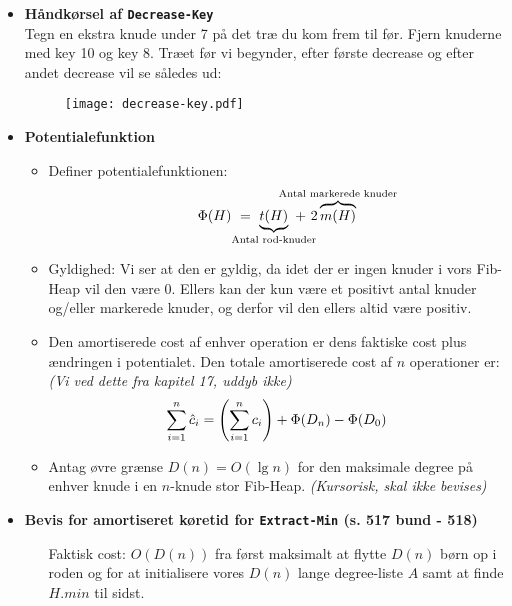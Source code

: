 \begin{itemize}
\item \textbf{Håndkørsel af \texttt{Decrease-Key}}\\
Tegn en ekstra knude under 7 på det træ du kom frem til før. Fjern knuderne med key 10 og key 8. Træet før vi begynder, efter første decrease og efter andet decrease vil se således ud:
\begin{figure}[H]
	\begin{center}
		\texttt{[image: decrease-key.pdf]}
	\end{center}
\end{figure}


\item \textbf{Potentialefunktion}
\begin{itemize}
	\item Definer potentialefunktionen:
	$$
	\Phi(H) \ = \ \underbrace{t(H)}_{\text{\makebox[0pt]{Antal rod-knuder}}} \ + \ 2   \overbrace{m(H)}^{\text{\makebox[0pt]{Antal markerede knuder}}}
	$$
	
	\item Gyldighed: Vi ser at den er gyldig, da idet der er ingen knuder i vors Fib-Heap vil den være 0. Ellers kan der kun være et positivt antal knuder og/eller markerede knuder, og derfor vil den ellers altid være positiv.
	
	\item Den amortiserede cost af enhver operation er dens faktiske cost plus ændringen i potentialet. Den totale amortiserede cost af $n$ operationer er: \textit{(Vi ved dette fra kapitel 17, uddyb ikke)}
	$$
	\sum_{i=1}^n \hat c_i = \left(  \sum_{i=1}^n c_i  \right) + \Phi(D_n) - \Phi(D_0)
	$$
	
	\item Antag øvre grænse $D(n) = O(\lg n)$ for den maksimale degree på enhver knude i en $n$-knude stor Fib-Heap. \textit{(Kursorisk, skal ikke bevises)}
\end{itemize}

\newpage
\item \textbf{Bevis for amortiseret køretid for \texttt{Extract-Min} (s. 517 bund - 518)}
\begin{itemize}
		\item[Faktisk cost:] $O(D(n))$ fra først maksimalt at flytte $D(n)$ børn op i roden og for at initialisere vores $D(n)$ lange degree-liste $A$ samt at finde $H.min$ til sidst.
		

\end{itemize}
\end{itemize}
